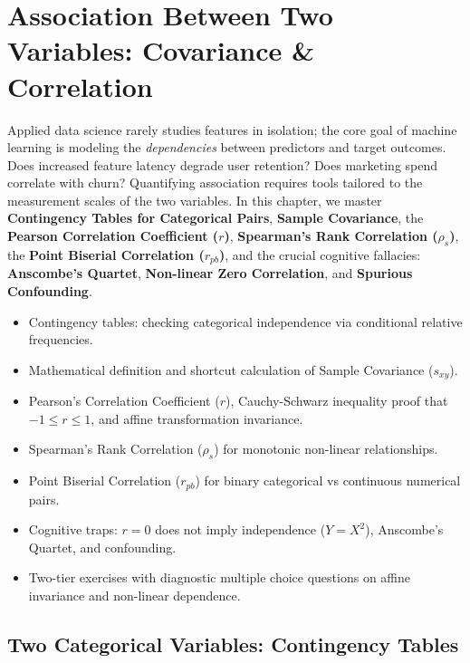 \chapter{Association Between Two Variables: Covariance \& Correlation}

Applied data science rarely studies features in isolation; the core goal of machine learning is modeling the \emph{dependencies} between predictors and target outcomes. Does increased feature latency degrade user retention? Does marketing spend correlate with churn? Quantifying association requires tools tailored to the measurement scales of the two variables. In this chapter, we master \textbf{Contingency Tables for Categorical Pairs}, \textbf{Sample Covariance}, the \textbf{Pearson Correlation Coefficient ($r$)}, \textbf{Spearman's Rank Correlation ($\rho_s$)}, the \textbf{Point Biserial Correlation ($r_{pb}$)}, and the crucial cognitive fallacies: \textbf{Anscombe's Quartet}, \textbf{Non-linear Zero Correlation}, and \textbf{Spurious Confounding}.

\vspace{0.5cm}
\begin{tcolorbox}[colback=primarylight, colframe=primarydark, title={\textbf{What You'll Learn in this Chapter}}]
\begin{itemize}
    \item Contingency tables: checking categorical independence via conditional relative frequencies.
    \item Mathematical definition and shortcut calculation of Sample Covariance ($s_{xy}$).
    \item Pearson's Correlation Coefficient ($r$), Cauchy-Schwarz inequality proof that $-1 \le r \le 1$, and affine transformation invariance.
    \item Spearman's Rank Correlation ($\rho_s$) for monotonic non-linear relationships.
    \item Point Biserial Correlation ($r_{pb}$) for binary categorical vs continuous numerical pairs.
    \item Cognitive traps: $r = 0$ does not imply independence ($Y = X^2$), Anscombe's Quartet, and confounding.
    \item Two-tier exercises with diagnostic multiple choice questions on affine invariance and non-linear dependence.
\end{itemize}
\end{tcolorbox}

\section{Two Categorical Variables: Contingency Tables}

